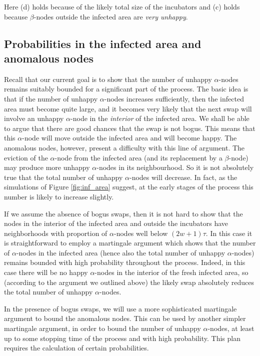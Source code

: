 \documentclass[11pt]{article}
\theoremstyle{plain}
\numberwithin{equation}{subsection}
\begin{document}
Here (d) holds because of the likely total size of the incubators
and (c) holds because $\beta$-nodes outside 
the infected area are {\em very unhappy}.



\subsection{Probabilities in the infected area and anomalous nodes}
Recall that our current goal is  to show that the number of unhappy 
$\alpha$-nodes remains suitably bounded for a significant part of the process. 
The basic idea is that if the number of unhappy $\alpha$-nodes  increases sufficiently,
then the infected area must become quite large, and it becomes very likely that the next swap will involve an 
unhappy $\alpha$-node in the \emph{interior} of the infected
area.  We shall be able to  argue that there are good 
chances that the swap is not bogus. This means
that this $\alpha$-node will move outside the infected area and will become happy.
The anomalous nodes, however, present a difficulty with this line of argument. 
The eviction of the $\alpha$-node from the infected area
(and its replacement by a $\beta$-node) may produce 
more unhappy $\alpha$-nodes in its 
neighbourhood.
So it is not absolutely true
that the total number of unhappy $\alpha$-nodes will decrease.
In fact, as the simulations of Figure \ref{fig:inf_area} suggest, 
at the early stages of the process this
number is likely to increase slightly.

If we assume the absence of bogus swaps, 
then it is not hard to show that the nodes in the interior of the infected
area and outside the incubators have neighborhoods with proportion of $\alpha$-nodes 
well below $(2w+1)\tau$. In this case
it is straightforward
to employ a  martingale argument which shows that the number of  
$\alpha$-nodes in the infected area (hence also the total number of unhappy
$\alpha$-nodes) remains bounded with high probability throughout the process.
Indeed, in this case there will be no happy $\alpha$-nodes in the interior of the 
fresh infected area,
so (according to the argument we outlined above) 
the likely swap absolutely reduces the total number of unhappy
$\alpha$-nodes.

In the presence of bogus swaps, we will use a more sophisticated martingale argument to bound
the anomalous nodes. This can be used by another simpler martingale argument, in order to bound the
number of unhappy $\alpha$-nodes, at least up to some stopping time of the process
and with high probability.
This plan requires the calculation of certain probabilities.
\end{document}
